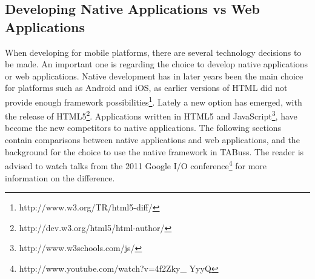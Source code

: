 \subsection{Developing Native Applications vs Web Applications}
\label{sec:nativeweb}
When developing for mobile platforms, there are several technology decisions to be made. An important one is regarding the choice to develop native applications or web applications. Native development has in later years been the main choice for platforms such as Android and iOS, as earlier versions of HTML did not provide enough framework possibilities\footnote{http://www.w3.org/TR/html5-diff/}. Lately a new option has emerged, with the release of HTML5\footnote{http://dev.w3.org/html5/html-author/}. Applications written in HTML5 and JavaScript\footnote{http://www.w3schools.com/js/}, have become the new competitors to native applications. The following sections contain comparisons between native applications and web applications, and the background for the choice to use the native framework in TABuss. The reader is advised to watch talks from the 2011 Google I/O conference\footnote{http://www.youtube.com/watch?v=4f2Zky\_ YyyQ} for more information on the difference.
\newpage
